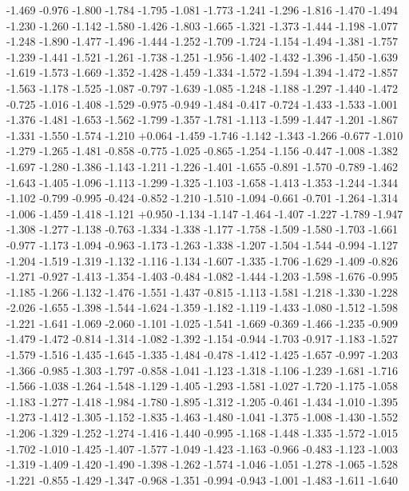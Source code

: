 \documentclass[9pt]{article}
\theoremstyle{plain}
\theoremstyle{definition}
\theoremstyle{remark}
\numberwithin{equation}{section}
\begin{document}
-1.469
-0.976
-1.800
-1.784
-1.795
-1.081
-1.773
-1.241
-1.296
-1.816
-1.470
-1.494
-1.230
-1.260
-1.142
-1.580
-1.426
-1.803
-1.665
-1.321
-1.373
-1.444
-1.198
-1.077
-1.248
-1.890
-1.477
-1.496
-1.444
-1.252
-1.709
-1.724
-1.154
-1.494
-1.381
-1.757
-1.239
-1.441
-1.521
-1.261
-1.738
-1.251
-1.956
-1.402
-1.432
-1.396
-1.450
-1.639
-1.619
-1.573
-1.669
-1.352
-1.428
-1.459
-1.334
-1.572
-1.594
-1.394
-1.472
-1.857
-1.563
-1.178
-1.525
-1.087
-0.797
-1.639
-1.085
-1.248
-1.188
-1.297
-1.440
-1.472
-0.725
-1.016
-1.408
-1.529
-0.975
-0.949
-1.484
-0.417
-0.724
-1.433
-1.533
-1.001
-1.376
-1.481
-1.653
-1.562
-1.799
-1.357
-1.781
-1.113
-1.599
-1.447
-1.201
-1.867
-1.331
-1.550
-1.574
-1.210
+0.064
-1.459
-1.746
-1.142
-1.343
-1.266
-0.677
-1.010
-1.279
-1.265
-1.481
-0.858
-0.775
-1.025
-0.865
-1.254
-1.156
-0.447
-1.008
-1.382
-1.697
-1.280
-1.386
-1.143
-1.211
-1.226
-1.401
-1.655
-0.891
-1.570
-0.789
-1.462
-1.643
-1.405
-1.096
-1.113
-1.299
-1.325
-1.103
-1.658
-1.413
-1.353
-1.244
-1.344
-1.102
-0.799
-0.995
-0.424
-0.852
-1.210
-1.510
-1.094
-0.661
-0.701
-1.264
-1.314
-1.006
-1.459
-1.418
-1.121
+0.950
-1.134
-1.147
-1.464
-1.407
-1.227
-1.789
-1.947
-1.308
-1.277
-1.138
-0.763
-1.334
-1.338
-1.177
-1.758
-1.509
-1.580
-1.703
-1.661
-0.977
-1.173
-1.094
-0.963
-1.173
-1.263
-1.338
-1.207
-1.504
-1.544
-0.994
-1.127
-1.204
-1.519
-1.319
-1.132
-1.116
-1.134
-1.607
-1.335
-1.706
-1.629
-1.409
-0.826
-1.271
-0.927
-1.413
-1.354
-1.403
-0.484
-1.082
-1.444
-1.203
-1.598
-1.676
-0.995
-1.185
-1.266
-1.132
-1.476
-1.551
-1.437
-0.815
-1.113
-1.581
-1.218
-1.330
-1.228
-2.026
-1.655
-1.398
-1.544
-1.624
-1.359
-1.182
-1.119
-1.433
-1.080
-1.512
-1.598
-1.221
-1.641
-1.069
-2.060
-1.101
-1.025
-1.541
-1.669
-0.369
-1.466
-1.235
-0.909
-1.479
-1.472
-0.814
-1.314
-1.082
-1.392
-1.154
-0.944
-1.703
-0.917
-1.183
-1.527
-1.579
-1.516
-1.435
-1.645
-1.335
-1.484
-0.478
-1.412
-1.425
-1.657
-0.997
-1.203
-1.366
-0.985
-1.303
-1.797
-0.858
-1.041
-1.123
-1.318
-1.106
-1.239
-1.681
-1.716
-1.566
-1.038
-1.264
-1.548
-1.129
-1.405
-1.293
-1.581
-1.027
-1.720
-1.175
-1.058
-1.183
-1.277
-1.418
-1.984
-1.780
-1.895
-1.312
-1.205
-0.461
-1.434
-1.010
-1.395
-1.273
-1.412
-1.305
-1.152
-1.835
-1.463
-1.480
-1.041
-1.375
-1.008
-1.430
-1.552
-1.206
-1.329
-1.252
-1.274
-1.416
-1.440
-0.995
-1.168
-1.448
-1.335
-1.572
-1.015
-1.702
-1.010
-1.425
-1.407
-1.577
-1.049
-1.423
-1.163
-0.966
-0.483
-1.123
-1.003
-1.319
-1.409
-1.420
-1.490
-1.398
-1.262
-1.574
-1.046
-1.051
-1.278
-1.065
-1.528
-1.221
-0.855
-1.429
-1.347
-0.968
-1.351
-0.994
-0.943
-1.001
-1.483
-1.611
-1.640
\end{document}
